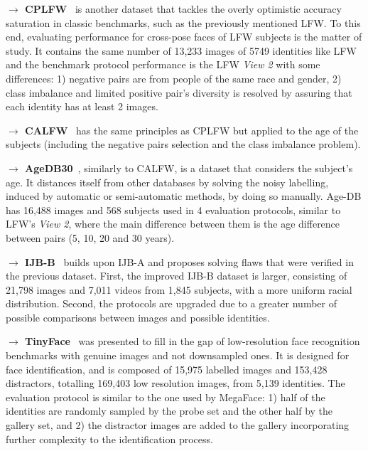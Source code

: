 \documentclass[class=report, crop=false, a4paper, 12pt]{standalone}
\begin{document}
\begin{appendix}
\vspace{0.7\baselineskip}
\noindent\textbf{$\rightarrow$ CPLFW}~\autocite{zhengCrossPoseLFWDatabase} is another dataset that tackles the overly optimistic accuracy saturation in classic benchmarks, such as the previously mentioned LFW. To this end, evaluating performance for cross-pose faces of LFW subjects is the matter of study. It contains the same number of 13,233 images of 5749 identities like LFW and the benchmark protocol performance is the LFW \textit{View 2} with some differences: 1) negative pairs are from people of the same race and gender, 2) class imbalance and limited positive pair's diversity is resolved by assuring that each identity has at least 2 images.

\vspace{0.7\baselineskip}
\noindent\textbf{$\rightarrow$ CALFW}~\autocite{zhengCrossAgeLFWDatabase2017} has the same principles as CPLFW but applied to the age of the subjects (including the negative pairs selection and the class imbalance problem).

\vspace{0.7\baselineskip}
\noindent\textbf{$\rightarrow$ AgeDB30}~\autocite{moschoglouAgeDBFirstManually2017}, similarly to CALFW, is a dataset that considers the subject's age. It distances itself from other databases by solving the noisy labelling, induced by automatic or semi-automatic methods, by doing so manually. Age-DB has 16,488 images and 568 subjects used in 4 evaluation protocols, similar to LFW's \textit{View 2}, where the main difference between them is the age difference between pairs (5, 10, 20 and 30 years).

\vspace{0.7\baselineskip}
\noindent\textbf{$\rightarrow$ IJB-B}~\autocite{whitelamIARPAJanusBenchmarkB2017} builds upon IJB-A and proposes solving flaws that were verified in the previous dataset. First, the improved IJB-B dataset is larger, consisting of 21,798 images and 7,011 videos from 1,845 subjects, with a more uniform racial distribution. Second, the protocols are upgraded due to a greater number of possible comparisons between images and possible identities.

\vspace{0.7\baselineskip}
\noindent\textbf{$\rightarrow$ TinyFace}~\autocite{chengLowResolutionFaceRecognition2019} was presented to fill in the gap of low-resolution face recognition benchmarks with genuine images and not downsampled ones. It is designed for face identification, and is composed of 15,975 labelled images and 153,428 distractors, totalling 169,403 low resolution images, from 5,139 identities. The evaluation protocol is similar to the one used by MegaFace: 1) half of the identities are randomly sampled by the probe set and the other half by the gallery set, and 2) the distractor images are added to the gallery incorporating further complexity to the identification process.


\end{appendix}
\end{document}
